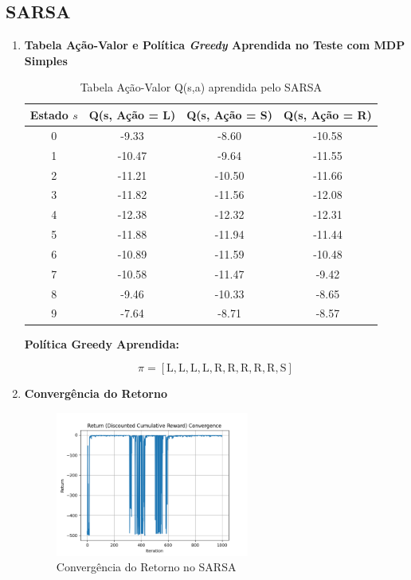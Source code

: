 \documentclass[a4paper,12pt]{article}
\begin{document}
\subsection{SARSA}
\begin{enumerate}[label=2.1.\arabic*.]
    \item \textbf{Tabela Ação-Valor e Política \textit{Greedy} Aprendida no Teste com MDP Simples}\\
    
    \begin{table}[h!]
    \centering
    \caption{Tabela Ação-Valor Q(s,a) aprendida pelo SARSA}
    \begin{tabular}{|c|c|c|c|}
    \hline
    \textbf{Estado $s$} & \textbf{Q(s, Ação = L)} & \textbf{Q(s, Ação = S)} & \textbf{Q(s, Ação = R)} \\
    \hline
    0 & -9.33 & -8.60 & -10.58 \\
    1 & -10.47 & -9.64 & -11.55 \\
    2 & -11.21 & -10.50 & -11.66 \\
    3 & -11.82 & -11.56 & -12.08 \\
    4 & -12.38 & -12.32 & -12.31 \\
    5 & -11.88 & -11.94 & -11.44 \\
    6 & -10.89 & -11.59 & -10.48 \\
    7 & -10.58 & -11.47 & -9.42 \\
    8 & -9.46 & -10.33 & -8.65 \\
    9 & -7.64 & -8.71 & -8.57 \\
    \hline
    \end{tabular}
    \end{table}

    \vspace{0.3cm}

    \noindent\textbf{Política Greedy Aprendida:}


    \[
    \pi = [\text{L}, \text{L}, \text{L}, \text{L}, \text{R}, \text{R}, \text{R}, \text{R}, \text{R}, \text{S}]
    \]
    
    \item \textbf{Convergência do Retorno}\\
    
    \begin{figure}[!h]
    \centering
    \includegraphics[width=0.6\textwidth]{sarsa/return_convergence.png}
    \caption{Convergência do Retorno no SARSA}
    \label{fig:sarsa_return_convergence}
    \end{figure}
    

\end{enumerate}
\end{document}
